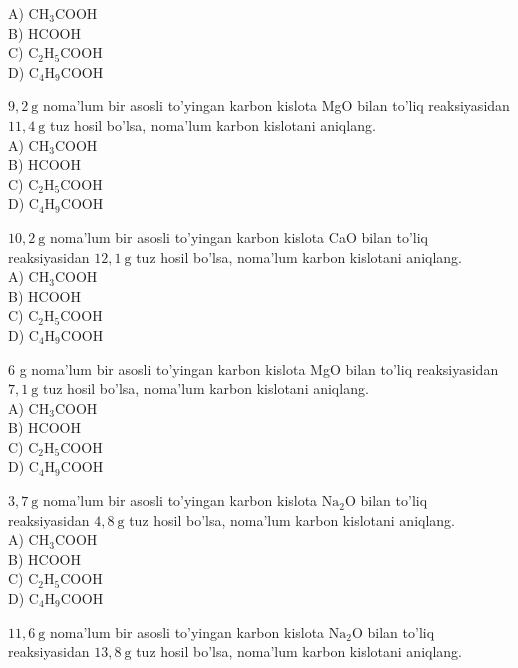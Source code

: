 A) $\mathrm{CH}_{3} \mathrm{COOH}$\\
B) HCOOH\\
C) $\mathrm{C}_{2} \mathrm{H}_{5} \mathrm{COOH}$\\
D) $\mathrm{C}_{4} \mathrm{H}_{9} \mathrm{COOH}$
  \item $9,2 \mathrm{~g}$ noma'lum bir asosli to'yingan karbon kislota MgO bilan to'liq reaksiyasidan $11,4 \mathrm{~g}$ tuz hosil bo'lsa, noma'lum karbon kislotani aniqlang.\\
A) $\mathrm{CH}_{3} \mathrm{COOH}$\\
B) HCOOH\\
C) $\mathrm{C}_{2} \mathrm{H}_{5} \mathrm{COOH}$\\
D) $\mathrm{C}_{4} \mathrm{H}_{9} \mathrm{COOH}$
  \item $10,2 \mathrm{~g}$ noma'lum bir asosli to'yingan karbon kislota CaO bilan to'liq reaksiyasidan $12,1 \mathrm{~g}$ tuz hosil bo'lsa, noma'lum karbon kislotani aniqlang.\\
A) $\mathrm{CH}_{3} \mathrm{COOH}$\\
B) HCOOH\\
C) $\mathrm{C}_{2} \mathrm{H}_{5} \mathrm{COOH}$\\
D) $\mathrm{C}_{4} \mathrm{H}_{9} \mathrm{COOH}$
  \item 6 g noma'lum bir asosli to'yingan karbon kislota MgO bilan to'liq reaksiyasidan $7,1 \mathrm{~g}$ tuz hosil bo'lsa, noma'lum karbon kislotani aniqlang.\\
A) $\mathrm{CH}_{3} \mathrm{COOH}$\\
B) HCOOH\\
C) $\mathrm{C}_{2} \mathrm{H}_{5} \mathrm{COOH}$\\
D) $\mathrm{C}_{4} \mathrm{H}_{9} \mathrm{COOH}$
  \item $3,7 \mathrm{~g}$ noma'lum bir asosli to'yingan karbon kislota $\mathrm{Na}_{2} \mathrm{O}$ bilan to'liq reaksiyasidan $4,8 \mathrm{~g}$ tuz hosil bo'lsa, noma'lum karbon kislotani aniqlang.\\
A) $\mathrm{CH}_{3} \mathrm{COOH}$\\
B) HCOOH\\
C) $\mathrm{C}_{2} \mathrm{H}_{5} \mathrm{COOH}$\\
D) $\mathrm{C}_{4} \mathrm{H}_{9} \mathrm{COOH}$
  \item $11,6 \mathrm{~g}$ noma'lum bir asosli to'yingan karbon kislota $\mathrm{Na}_{2} \mathrm{O}$ bilan to'liq reaksiyasidan $13,8 \mathrm{~g}$ tuz hosil bo'lsa, noma'lum karbon kislotani aniqlang.\\
